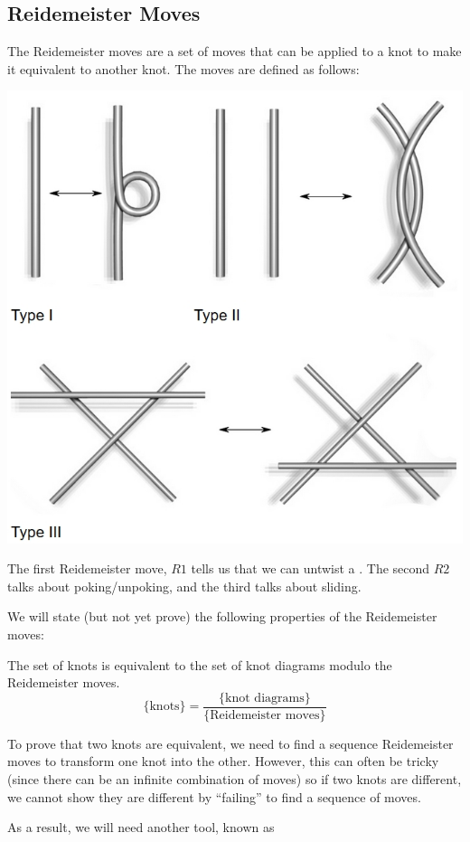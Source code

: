 \documentclass{article}
\begin{document}
\subsection{Reidemeister Moves}
The Reidemeister moves are a set of moves that can be applied to a knot to make it equivalent to another knot. The moves are defined as follows:
\begin{center}
    \includegraphics[width=0.4\linewidth]{figures/reidemeister.jpg}
\end{center}
The first Reidemeister move, $R1$ tells us that we can untwist a . The second $R2$ talks about poking/unpoking, and the third talks about sliding.

We will state (but not yet prove) the following properties of the Reidemeister moves:
\begin{theorem}
    The set of knots is equivalent to the set of knot diagrams modulo the Reidemeister moves.
    \begin{equation}
        \{\text{knots}\} = \frac{\{\text{knot diagrams}\}}{\{\text{Reidemeister moves}\}}
    \end{equation}
\end{theorem}
To prove that two knots are equivalent, we need to find a sequence Reidemeister moves to transform one knot into the other. However, this can often be tricky (since there can be an infinite combination of moves) so if two knots are different, we cannot show they are different by ``failing'' to find a sequence of moves.

As a result, we will need another tool, known as 
\end{document}
